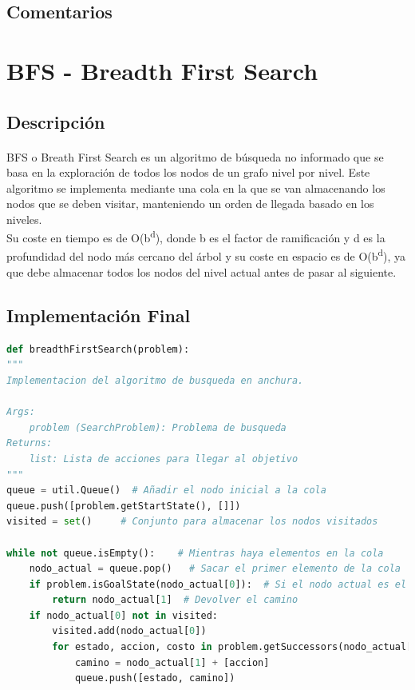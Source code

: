 \documentclass{report}
\begin{document}
        \subsection*{Comentarios}
          \paragraph*{}{

          }
      \clearpage\section{BFS - Breadth First Search}
        \subsection*{Descripción}
          \paragraph*{}{
            BFS o Breath First Search es un algoritmo de búsqueda no informado que se basa en la exploración de todos los nodos de un grafo nivel por nivel. Este algoritmo se implementa mediante una cola en la que se van almacenando los nodos que se deben visitar, manteniendo un orden de llegada basado en los niveles.\\ 
            Su coste en tiempo es de O(b\textsuperscript{d}), donde b es el factor de ramificación y d es la profundidad del nodo más cercano del árbol y su coste en espacio es de O(b\textsuperscript{d}), ya que debe almacenar todos los nodos del nivel actual antes de pasar al siguiente.\\
          }
        \subsection*{Implementación Final}
          \begin{lstlisting}[language=Python, caption=Implementación final del BFS]
def breadthFirstSearch(problem):
"""
Implementacion del algoritmo de busqueda en anchura.

Args:
    problem (SearchProblem): Problema de busqueda
Returns:
    list: Lista de acciones para llegar al objetivo
"""
queue = util.Queue()  # Añadir el nodo inicial a la cola
queue.push([problem.getStartState(), []])
visited = set()     # Conjunto para almacenar los nodos visitados

while not queue.isEmpty():    # Mientras haya elementos en la cola
    nodo_actual = queue.pop()   # Sacar el primer elemento de la cola
    if problem.isGoalState(nodo_actual[0]):  # Si el nodo actual es el objetivo
        return nodo_actual[1]  # Devolver el camino
    if nodo_actual[0] not in visited:
        visited.add(nodo_actual[0])
        for estado, accion, costo in problem.getSuccessors(nodo_actual[0]): # Añadir los hijos del nodo actual a la cola
            camino = nodo_actual[1] + [accion]
            queue.push([estado, camino])
          \end{lstlisting}
\end{document}
